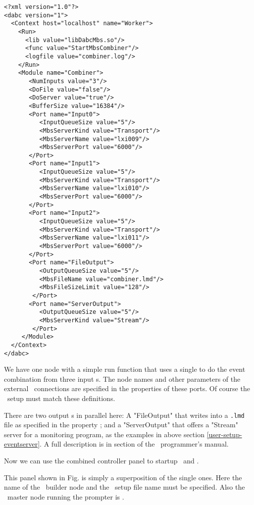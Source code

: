 \begin{small}
\begin{verbatim}
<?xml version="1.0"?>
<dabc version="1">
  <Context host="localhost" name="Worker">
    <Run>
      <lib value="libDabcMbs.so"/>
      <func value="StartMbsCombiner"/>
      <logfile value="combiner.log"/>
    </Run>
    <Module name="Combiner">
       <NumInputs value="3"/>
       <DoFile value="false"/>
       <DoServer value="true"/>
       <BufferSize value="16384"/>
       <Port name="Input0">
          <InputQueueSize value="5"/>
          <MbsServerKind value="Transport"/>
          <MbsServerName value="lxi009"/>
          <MbsServerPort value="6000"/>
       </Port>
       <Port name="Input1">
          <InputQueueSize value="5"/>
          <MbsServerKind value="Transport"/>
          <MbsServerName value="lxi010"/>
          <MbsServerPort value="6000"/>
       </Port>
       <Port name="Input2">
          <InputQueueSize value="5"/>
          <MbsServerKind value="Transport"/>
          <MbsServerName value="lxi011"/>
          <MbsServerPort value="6000"/>
       </Port>
       <Port name="FileOutput">
          <OutputQueueSize value="5"/>
          <MbsFileName value="combiner.lmd"/>
          <MbsFileSizeLimit value="128"/>
        </Port>
       <Port name="ServerOutput">
          <OutputQueueSize value="5"/>
          <MbsServerKind value="Stream"/>
        </Port>
     </Module>
  </Context>
</dabc>
\end{verbatim}
\end{small}

We have one node  with a simple run function 
 that uses a single  to do the
event combination from three input s.
The node names and other parameters of the external \mbs\ connections
are specified in the  properties of these ports.
Of course the \mbs\ setup must match these definitions. 

There are two output s in parallel here: A "FileOutput"
that writes into a {\tt *.lmd} file as specified in the property 
; and a "ServerOutput" that offers a "Stream" server
for a monitoring program, as the examples in above section \ref{user-setup-eventserver}.
A full description is in section
 of the \dabc\ programmer's manual.


Now we can use the combined  controller panel to startup \mbs\ and \dabc.

This panel shown in Fig.  is simply a superposition of the single ones.
Here the name of the \dabc\ builder  node and
the \dabc\ setup file name must be specified. Also the \mbs\
master node running the prompter is . 

